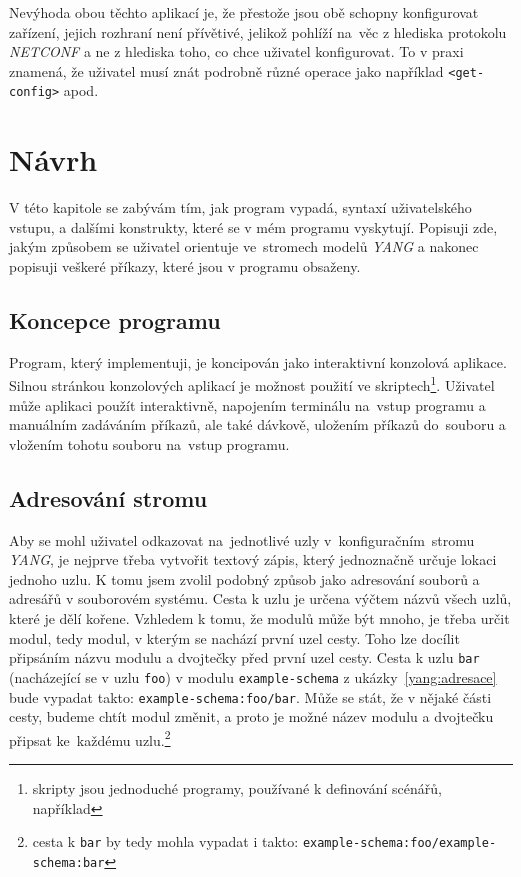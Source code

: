 \documentclass[thesis=B,czech,hidelinks]{FITthesis}[2019/03/06]
\begin{document}
Nevýhoda obou těchto aplikací je, že přestože jsou obě schopny konfigurovat zařízení, jejich rozhraní není přívětivé, jelikož pohlíží na~věc z hlediska protokolu \textit{NETCONF} a ne z hlediska toho, co chce uživatel konfigurovat. To v praxi znamená, že uživatel musí znát podrobně různé operace jako například \texttt{<get-config>} apod.


\chapter{Návrh}
V této kapitole se zabývám tím, jak program vypadá, syntaxí uživatelského vstupu, a dalšími konstrukty, které se v mém programu vyskytují. Popisuji zde, jakým způsobem se uživatel orientuje ve~stromech modelů \textit{YANG} a nakonec popisuji veškeré příkazy, které jsou v programu obsaženy.


\section{Koncepce programu}
Program, který implementuji, je koncipován jako interaktivní konzolová aplikace. Silnou stránkou konzolových aplikací je možnost použití ve skriptech\footnote{skripty jsou jednoduché programy, používané k definování scénářů, například }. Uživatel může aplikaci použít interaktivně, napojením terminálu na~vstup programu a manuálním zadáváním příkazů, ale také dávkově, uložením příkazů do~souboru a vložením tohotu souboru na~vstup programu.

\section{Adresování stromu}
Aby se mohl uživatel odkazovat na~jednotlivé uzly v~konfiguračním~stromu \textit{YANG}, je nejprve třeba vytvořit textový zápis, který jednoznačně určuje lokaci jednoho uzlu. K tomu jsem zvolil podobný způsob jako adresování souborů a adresářů v souborovém systému. Cesta k uzlu je určena výčtem názvů všech uzlů, které je dělí kořene. Vzhledem k tomu, že modulů může být mnoho, je třeba určit  modul, tedy modul, v kterým se nachází první uzel cesty. Toho lze docílit připsáním názvu modulu a dvojtečky před první uzel cesty. Cesta k uzlu \texttt{bar} (nacházející se v uzlu \texttt{foo}) v modulu \texttt{example-schema} z ukázky~\ref{yang:adresace} bude vypadat takto: \texttt{example-schema:foo/bar}. Může se stát, že v nějaké části cesty, budeme chtít  modul změnit, a proto je možné název modulu a dvojtečku připsat ke~každému uzlu.\footnote{cesta k \texttt{bar} by tedy mohla vypadat i takto: \texttt{example-schema:foo/example-schema:bar}}
\end{document}
